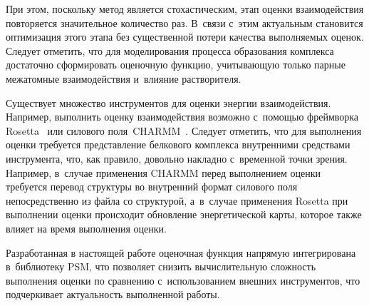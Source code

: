 При этом, поскольку метод является стохастическим, этап оценки взаимодействия повторяется значительное количество раз. В~связи с~этим актуальным становится оптимизация этого этапа без существенной потери качества выполняемых оценок. Следует отметить, что для моделирования процесса образования комплекса достаточно сформировать оценочную функцию, учитывающую только парные межатомные взаимодействия и~влияние растворителя\cite{biom10071056}.

Существует множество инструментов для оценки энергии взаимодействия. Например, выполнить оценку взаимодействия возможно с~помощью фреймворка Rosetta~\cite{rosetta} или силового поля~CHARMM~\cite{brooks}. Следует отметить, что для выполнения оценки требуется представление белкового комплекса внутренними средствами инструмента, что, как правило, довольно накладно с~временной точки зрения. Например, в~случае применения CHARMM перед выполнением оценки требуется перевод структуры во внутренний формат силового поля непосредственно из файла со структурой, а~в~случае применения Rosetta при выполнении оценки происходит обновление энергетической карты, которое также влияет на время выполнения оценки. 

Разработанная в настоящей работе оценочная функция напрямую интегрирована в~библиотеку PSM, что позволяет снизить вычислительную сложность выполнения оценки по сравнению с~использованием внешних инструментов, что подчеркивает актуальность выполненной работы.
